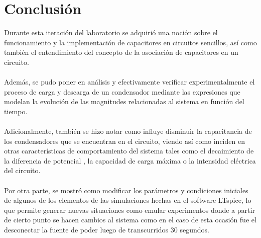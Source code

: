 \documentclass[letterpaper,11pt]{article} %
\begin{document}
\section{Conclusión}
Durante esta iteración del laboratorio se adquirió una noción sobre el funcionamiento y la implementación de capacitores en circuitos sencillos, así como también el entendimiento del concepto de la asociación de capacitores en un circuito.\\\\

Además, se pudo poner en análisis y efectivamente verificar experimentalmente el proceso de carga y descarga de un condensador mediante las expresiones que modelan la evolución de las magnitudes relacionadas al sistema en función del tiempo.\\\\

Adicionalmente, también se hizo notar como influye disminuir la capacitancia de los condensadores que se encuentran en el circuito, viendo así como inciden en otras características de comportamiento del sistema tales como el decaimiento de la diferencia de potencial , la capacidad de carga máxima o la intensidad eléctrica del circuito.\\\\

Por otra parte, se mostró como modificar los parámetros y condiciones iniciales de algunos de los elementos de las simulaciones hechas en el software LTspice, lo que permite generar nuevas situaciones como emular experimentos donde a partir de cierto punto se hacen cambios al sistema como en el caso de esta ocasión fue el desconectar la fuente de poder luego de transcurridos $30$ segundos. \\\\

\end{document}
